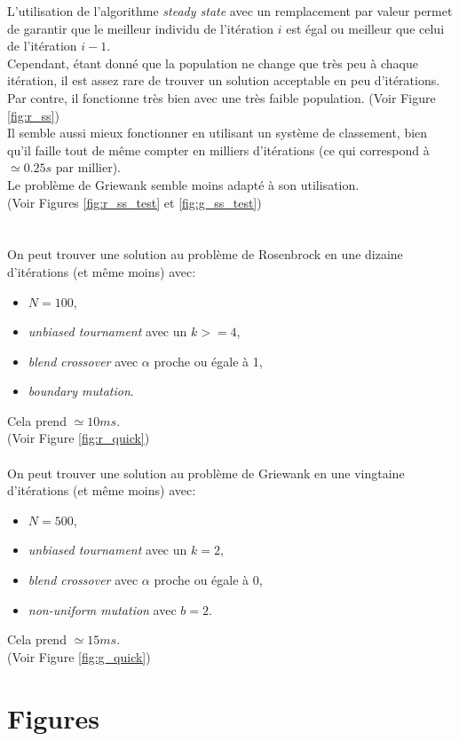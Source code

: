 \documentclass[12pt, letterpaper]{article}
\begin{document}
L'utilisation de l'algorithme \textit{steady state} avec un remplacement
par valeur permet de garantir que le meilleur individu de l'itération
$i$ est égal ou meilleur que celui de l'itération $i - 1$.
\\
Cependant, étant donné que la population ne change que très peu à
chaque itération, il est assez rare de trouver un solution acceptable
en peu d'itérations.\\
Par contre, il fonctionne très bien avec une très faible population.
(Voir Figure \ref{fig:r_ss})
\\
Il semble aussi mieux fonctionner en utilisant un système de
classement, bien qu'il faille tout de même compter en milliers
d'itérations (ce qui correspond à $\simeq 0.25s$ par millier).
\\
Le problème de Griewank semble moins adapté à son utilisation.
\\
(Voir Figures \ref{fig:r_ss_test} et \ref{fig:g_ss_test})
\\
\\
\\
On peut trouver une solution au problème de Rosenbrock en une dizaine
d'itérations (et même moins) avec:
\begin{itemize}
\item  $N = 100$,
\item \textit{unbiased tournament} avec un $k >= 4$,
\item \textit{blend crossover} avec $\alpha$ proche ou égale à 1,
\item \textit{boundary mutation}.
\end{itemize}
Cela prend $\simeq 10ms$.\\
(Voir Figure \ref{fig:r_quick})
\\
\\
On peut trouver une solution au problème de Griewank en une vingtaine d'itérations (et même moins) avec:
\begin{itemize}
\item  $N = 500$,
\item \textit{unbiased tournament} avec un $k = 2$,
\item \textit{blend crossover} avec  $\alpha$ proche ou égale à 0,
\item \textit{non-uniform mutation} avec $b = 2$.
\end{itemize}
Cela prend $\simeq 15ms$.\\
(Voir Figure \ref{fig:g_quick})


\newpage

\section{Figures}
\clearpage{}
\end{document}

